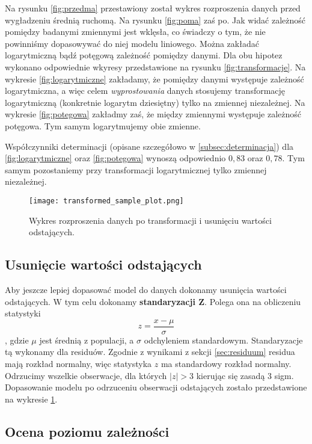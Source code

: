 \documentclass{article}
\begin{document}
Na rysunku \ref{fig:przedma} przestawiony został wykres rozproszenia danych przed wygładzeniu średnią ruchomą. Na rysunku \ref{fig:poma} zaś po. 
Jak widać zależność pomiędzy badanymi zmiennymi jest wklęsła, co świadczy o tym, że nie powinniśmy dopasowywać do niej modelu liniowego. Można zakładać logarytmiczną bądź potęgową zależność pomiędzy danymi. Dla obu hipotez wykonano odpowiednie wkyresy przedstawione na rysunku \ref{fig:transformacje}. Na wykresie \ref{fig:logarytmiczne} zakładamy, że pomiędzy danymi występuje zależność logarytmiczna, a więc celem \textit{wyprostowania} danych stosujemy transformację logarytmiczną (konkretnie logarytm dziesiętny) tylko na zmiennej niezależnej. Na wykresie \ref{fig:potegowa} zakładmy zaś, że między zmiennymi występuje zależność potęgowa. Tym samym logarytmujemy obie zmienne. 


Współczynniki determinacji (opisane szczegółowo w \ref{subsec:determinacja}) dla \ref{fig:logarytmiczne} oraz \ref{fig:potegowa} wynoszą odpowiednio $ 0,83 $ oraz $ 0,78 $. Tym samym pozostaniemy przy transformacji logarytmicznej tylko zmiennej niezależnej. \\ 

\begin{figure}[!h]
  \centering
  \texttt{[image: transformed\_sample\_plot.png]}
  \caption{Wykres rozproszenia danych po transformacji i usunięciu wartości odstających.}
  \label{fig:poodrzuceniu}
\end{figure}

\subsection{Usunięcie wartości odstających}
Aby jeszcze lepiej dopasować model do danych dokonamy usunięcia wartości odstających. W tym celu dokonamy \textbf{standaryzacji Z}. Polega ona na obliczeniu statystyki 
$$ z = \frac{x - \mu}{\sigma} $$, gdzie $\mu$ jest średnią z populacji, a $\sigma$ odchyleniem standardowym. Standaryzacje tą wykonamy dla residuów. Zgodnie z wynikami z sekcji \ref{sec:residuum} residua mają rozkład normalny, więc statystyka $z$ ma standardowy rozkład normalny. Odrzucimy wszelkie obserwacje, dla których $|z| > 3$ kierując się zasadą 3 sigm. Dopasowanie modelu po odrzuceniu obserwacji odstających zostało przedstawione na wykresie \ref{fig:poodrzuceniu}.

\subsection{Ocena poziomu zależności}
\end{document}
